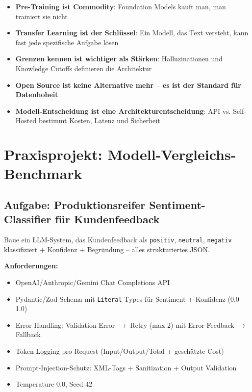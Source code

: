 \par\mbox{}\par
\begin{merkeEnv}
\begin{itemize}
    \item \textbf{Pre-Training ist Commodity}: Foundation Models kauft man, man trainiert sie nicht
    \item \textbf{Transfer Learning ist der Schlüssel}: Ein Modell, das Text versteht, kann fast jede spezifische Aufgabe lösen
    \item \textbf{Grenzen kennen ist wichtiger als Stärken}: Halluzinationen und Knowledge Cutoffs definieren die Architektur
    \item \textbf{Open Source ist keine Alternative mehr -- es ist der Standard für Datenhoheit}
    \item \textbf{Modell-Entscheidung ist eine Architekturentscheidung}: API vs. Self-Hosted bestimmt Kosten, Latenz und Sicherheit
\end{itemize}
\end{merkeEnv}

\section{Praxisprojekt: Modell-Vergleichs-Benchmark}


\subsection{Aufgabe: Produktionsreifer Sentiment-Classifier für Kundenfeedback}

Baue ein LLM-System, das Kundenfeedback als \texttt{positiv}, \texttt{neutral}, \texttt{negativ} klassifiziert + Konfidenz + Begründung -- alles strukturiertes JSON.

\textbf{Anforderungen:}
\begin{itemize}[leftmargin=*]
    \item OpenAI/Anthropic/Gemini Chat Completions API
    \item Pydantic/Zod Schema mit \texttt{Literal} Types für Sentiment + Konfidenz (0.0-1.0)
    \item Error Handling: Validation Error $\to$ Retry (max 2) mit Error-Feedback $\to$ Fallback
    \item Token-Logging pro Request (Input/Output/Total + geschätzte Cost)
    \item Prompt-Injection-Schutz: XML-Tags + Sanitization + Output Validation
    \item Temperature 0.0, Seed 42
\end{itemize}

